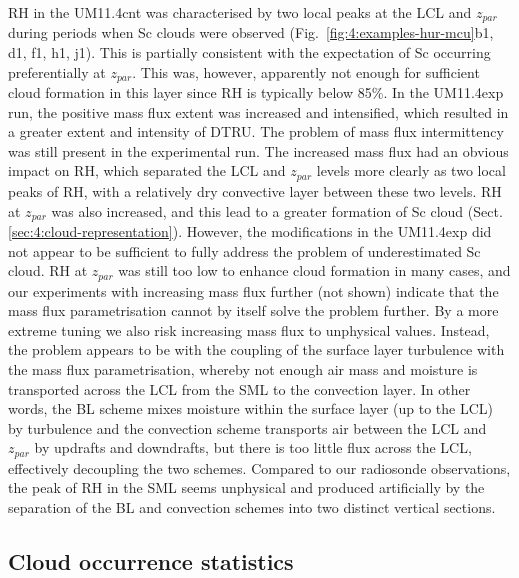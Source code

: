 RH in the UM11.4cnt was characterised by two local peaks at the LCL and $z_{par}$
during periods when Sc clouds were observed (Fig.~\ref{fig:4:examples-hur-mcu}b1, d1, f1, h1, j1). This is partially consistent
with the expectation of Sc occurring preferentially at $z_{par}$. This was, however, apparently not enough for sufficient cloud formation in this layer since RH is typically below 85\%.
In the UM11.4exp run, the positive mass flux extent was increased and intensified,
which resulted in a greater extent and intensity of DTRU. The problem of
mass flux intermittency was still present in the experimental run. The increased
mass flux had an obvious impact on RH, which separated the LCL and $z_{par}$
levels more clearly as two local peaks of RH, with a relatively dry
convective layer between these two levels. RH at $z_{par}$ was also increased,
and this lead to a greater formation of Sc cloud (Sect.
\ref{sec:4:cloud-representation}).  %
However, the modifications in the UM11.4exp
did not appear to be sufficient to fully address the problem of underestimated
Sc cloud. RH at $z_{par}$ was still too low to enhance cloud formation in many cases, and our experiments with
increasing mass flux further (not shown) indicate that the mass flux
parametrisation cannot by itself solve the problem further. By a more extreme
tuning we also risk increasing mass flux to unphysical values.
Instead, the problem appears to be with the coupling of the surface layer
turbulence with the mass flux parametrisation, whereby not enough air mass
and moisture is transported across the LCL from the SML to the convection layer. In
other words, the BL scheme mixes moisture within the surface layer (up to the LCL)
by turbulence and the convection scheme transports air between the LCL and
$z_{par}$ by updrafts and downdrafts, but there is too little flux across the LCL,
effectively decoupling the two schemes. Compared to our
radiosonde observations, the peak of RH in the SML seems unphysical and
produced artificially by the separation of the BL and convection schemes
into two distinct vertical sections.


\subsection{Cloud occurrence statistics}
\label{sec:4:cloud-occurrence-statistics}

